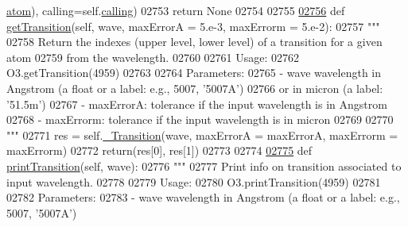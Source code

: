 \begin{DoxyCode}
{{{{{{{{{{{{{{{{{{{{{{      \hyperlink{classpyneb_1_1core_1_1pynebcore_1_1_rec_atom_a1a2aa175da6b5b8847f409e37437e3d3}{atom}), calling=self.\hyperlink{classpyneb_1_1core_1_1pynebcore_1_1_rec_atom_a82ec425ebba32b73a5d9ae52717d47c4}{calling})
02753             \textcolor{keywordflow}{return} \textcolor{keywordtype}{None}
02754         
02755         
\hypertarget{pynebcore_8py_source_l02756}{}\hyperlink{classpyneb_1_1core_1_1pynebcore_1_1_rec_atom_abc77497db8e5d888d8424e4a82d50c2e}{02756}     \textcolor{keyword}{def }\hyperlink{classpyneb_1_1core_1_1pynebcore_1_1_rec_atom_abc77497db8e5d888d8424e4a82d50c2e}{getTransition}(self, wave, maxErrorA = 5.e-3, maxErrorm = 5.e-2):
02757         \textcolor{stringliteral}{"""}
02758 \textcolor{stringliteral}{        Return the indexes (upper level, lower level) of a transition for a given atom }
02759 \textcolor{stringliteral}{            from the wavelength.}
02760 \textcolor{stringliteral}{        }
02761 \textcolor{stringliteral}{        Usage:}
02762 \textcolor{stringliteral}{            O3.getTransition(4959)}
02763 \textcolor{stringliteral}{            }
02764 \textcolor{stringliteral}{        Parameters:}
02765 \textcolor{stringliteral}{            - wave      wavelength in Angstrom (a float or a label: e.g., 5007, '5007A') }
02766 \textcolor{stringliteral}{                or in micron (a label: '51.5m')}
02767 \textcolor{stringliteral}{            - maxErrorA: tolerance if the input wavelength is in Angstrom}
02768 \textcolor{stringliteral}{            - maxErrorm: tolerance if the input wavelength is in micron}
02769 \textcolor{stringliteral}{                }
02770 \textcolor{stringliteral}{        """} 
02771         res = self.\hyperlink{classpyneb_1_1core_1_1pynebcore_1_1_rec_atom_a32b31a371f3b6ecc5bbbc4d0c5d2a855}{\_Transition}(wave, maxErrorA = maxErrorA, maxErrorm = maxErrorm)
02772         return(res[0], res[1])
02773         
02774         
\hypertarget{pynebcore_8py_source_l02775}{}\hyperlink{classpyneb_1_1core_1_1pynebcore_1_1_rec_atom_acdf8a7cf94fee8be8335e4651c318a30}{02775}     \textcolor{keyword}{def }\hyperlink{classpyneb_1_1core_1_1pynebcore_1_1_rec_atom_acdf8a7cf94fee8be8335e4651c318a30}{printTransition}(self, wave):
02776         \textcolor{stringliteral}{"""}
02777 \textcolor{stringliteral}{        Print info on transition associated to input wavelength.}
02778 \textcolor{stringliteral}{        }
02779 \textcolor{stringliteral}{        Usage:}
02780 \textcolor{stringliteral}{            O3.printTransition(4959)}
02781 \textcolor{stringliteral}{            }
02782 \textcolor{stringliteral}{        Parameters:}
02783 \textcolor{stringliteral}{            - wave      wavelength in Angstrom (a float or a label: e.g., 5007, '5007A') }
}}}}}}}}}}}}}}}}}}}}}}
\end{DoxyCode}
